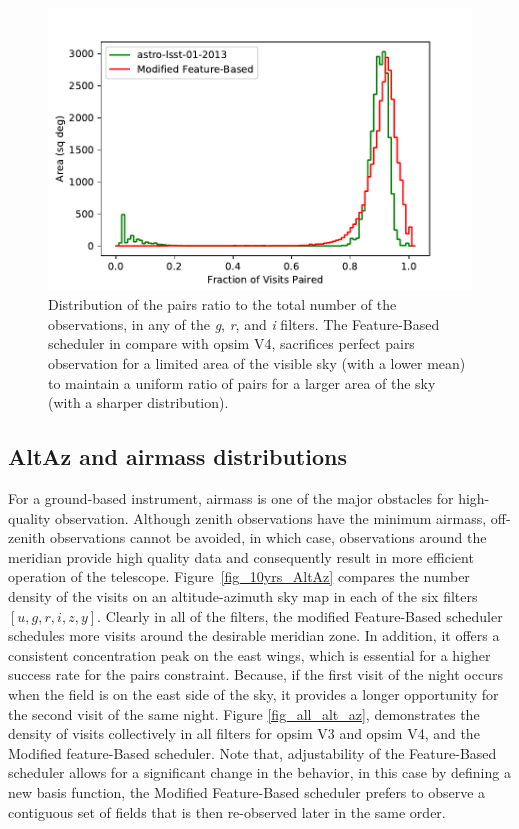 \documentclass[12pt]{aastex62}
\theoremstyle{definition}
\begin{document}
\begin{figure}[h!]
\centering
\includegraphics[width=.4\linewidth]{PairHist.pdf}
\caption{Distribution of the pairs ratio to the total number of the observations, in any of the \textit{g}, \textit{r}, and \textit{i} filters. The Feature-Based scheduler in compare with opsim V4, sacrifices perfect pairs observation for a limited area of the visible sky (with a lower mean) to maintain a uniform ratio of pairs for a larger area of the sky (with a sharper distribution).}
\label{fig_10yrs_pair_hist}
\end{figure}

\subsection{AltAz and airmass distributions}
For a ground-based instrument, airmass is one of the major obstacles for high-quality observation. Although zenith observations have the minimum airmass, off-zenith observations cannot be avoided, in which case, observations around the meridian provide high quality data and consequently result in more efficient operation of the telescope. Figure~\ref{fig_10yrs_AltAz} compares the number density of the visits on an altitude-azimuth sky map in each of the six filters $[u,g,r,i,z,y]$. Clearly in all of the filters, the modified Feature-Based scheduler schedules more visits around the desirable meridian zone. In addition, it offers a consistent concentration peak on the east wings, which is essential for a higher success rate for the pairs constraint. Because, if the first visit of the night occurs when the field is on the east side of the sky, it provides a longer opportunity for the second visit of the same night. Figure \ref{fig_all_alt_az}, demonstrates the density of visits collectively in all filters for opsim V3 and opsim V4, and the Modified feature-Based scheduler. Note that, adjustability of the Feature-Based scheduler allows for a significant change in the behavior, in this case by defining a new basis function, the Modified Feature-Based scheduler prefers to observe a contiguous set of fields that is then re-observed later in the same order.
\end{document}
